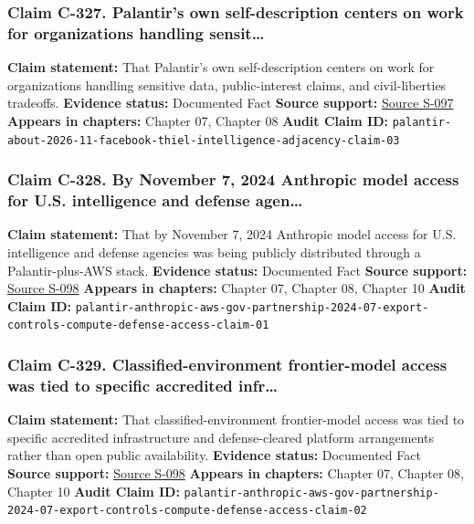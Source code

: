 \documentclass[
  american,
  11pt,
  letterpaper,
]{article}
\begin{document}
\subsubsection{Claim C-327. Palantir's own self-description centers on
work for organizations handling
sensit\ldots{}}\label{claim-c-327-palantir-s-own-self-description-centers-on-work-for-organizations-handling-sensit}

\textbf{Claim statement:} That Palantir's own self-description centers
on work for organizations handling sensitive data, public-interest
claims, and civil-liberties tradeoffs. \textbf{Evidence status:}
Documented Fact \textbf{Source support:}
\hyperref[source-s-097-about-palantir]{Source S-097} \textbf{Appears in
chapters:} Chapter 07, Chapter 08 \textbf{Audit Claim ID:}
\texttt{palantir-about-2026-11-facebook-thiel-intelligence-adjacency-claim-03}

\subsubsection{Claim C-328. By November 7, 2024 Anthropic model access
for U.S. intelligence and defense
agen\ldots{}}\label{claim-c-328-by-november-7-2024-anthropic-model-access-for-u-s-intelligence-and-defense-agen}

\textbf{Claim statement:} That by November 7, 2024 Anthropic model
access for U.S. intelligence and defense agencies was being publicly
distributed through a Palantir-plus-AWS stack. \textbf{Evidence status:}
Documented Fact \textbf{Source support:}
\hyperref[source-s-098-anthropic-and-palantir-partner-to-bring-claude-ai-models-to-aws-for-u-s-government-intelligence-and-defense-operations]{Source
S-098} \textbf{Appears in chapters:} Chapter 07, Chapter 08, Chapter 10
\textbf{Audit Claim ID:}
\texttt{palantir-anthropic-aws-gov-partnership-2024-07-export-controls-compute-defense-access-claim-01}

\subsubsection{Claim C-329. Classified-environment frontier-model access
was tied to specific accredited
infr\ldots{}}\label{claim-c-329-classified-environment-frontier-model-access-was-tied-to-specific-accredited-infr}

\textbf{Claim statement:} That classified-environment frontier-model
access was tied to specific accredited infrastructure and
defense-cleared platform arrangements rather than open public
availability. \textbf{Evidence status:} Documented Fact \textbf{Source
support:}
\hyperref[source-s-098-anthropic-and-palantir-partner-to-bring-claude-ai-models-to-aws-for-u-s-government-intelligence-and-defense-operations]{Source
S-098} \textbf{Appears in chapters:} Chapter 07, Chapter 08, Chapter 10
\textbf{Audit Claim ID:}
\texttt{palantir-anthropic-aws-gov-partnership-2024-07-export-controls-compute-defense-access-claim-02}
\end{document}
